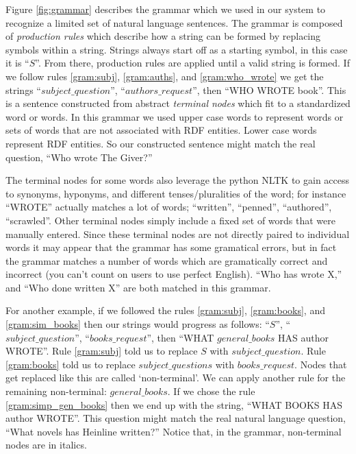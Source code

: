 \documentclass[11pt]{article}
\begin{document}
{Figure \ref{fig:grammar} describes the grammar which we used in our system to recognize
a limited set of natural language sentences. The grammar is composed of {\em production
rules} which describe how a string can be formed by replacing symbols within a
string. Strings always start off as a starting symbol, in this case it is ``$S$''. From 
there, production rules are applied until a valid string is formed. If we follow rules 
\ref{gram:subj}, \ref{gram:auths}, and \ref{gram:who_wrote} we get the strings 
``$subject\_question$'', ``$authors\_request$'', then ``WHO WROTE book''. This is a sentence
constructed from abstract {\em terminal nodes} which fit to a standardized word or words.
In this grammar we used upper case words to represent words or sets of words that are 
not associated with RDF entities. Lower case words represent RDF entities. 
So our constructed sentence might match the real question, ``Who wrote The Giver?''

The terminal nodes for some words also leverage the python NLTK\cite{nltk} to gain access 
to synonyms, hyponyms, and different tenses/pluralities of the word; 
for instance ``WROTE'' actually matches a lot of words; 
``written'', ``penned'', ``authored'', ``scrawled''. Other terminal nodes
simply include a fixed set of words that were manually entered.
Since these terminal nodes are not directly paired to individual words it may appear that
the grammar has some gramatical errors, but in fact the grammar matches a number of
words which are gramatically correct and incorrect (you can't count on users to use
perfect English). ``Who has wrote X,'' and ``Who done written X'' are both matched in this
grammar.

For another example, if we followed the rules \ref{gram:subj}, \ref{gram:books}, 
and \ref{gram:sim_books} then our strings would progress as follows: 
``$S$'', ``$subject\_question$'', ``$books\_request$'', 
then ``WHAT $general\_books$ HAS author WROTE''. 
Rule \ref{gram:subj} told us to 
replace $S$ with $subject\_question$. Rule \ref{gram:books} told us to replace
$subject\_questions$ with $books\_request$. Nodes that get replaced like this
are called `non-terminal'. We can apply another rule for the remaining
non-terminal: $general\_books$. If we chose the rule
\ref{gram:simp_gen_books} then we end up with the
string, ``WHAT BOOKS HAS author WROTE''. This question might match the
real natural language question, ``What novels has Heinline written?'' 
Notice that, in the grammar, non-terminal nodes are in italics.

}
\end{document}
